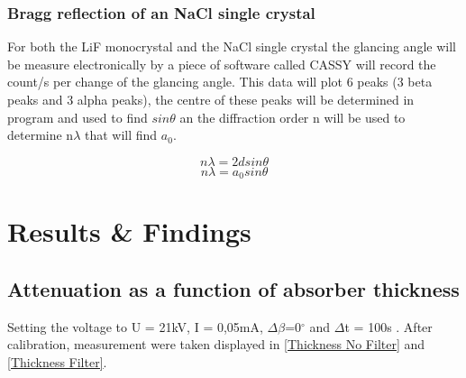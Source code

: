 \documentclass[12pt]{article}
\begin{document}
\subsubsection{Bragg reflection of an NaCl single crystal}
\label{Bragg reflection of an NaCl single crystal SubsubSection}

For both the LiF monocrystal and the NaCl single crystal the glancing angle will be measure electronically by a piece of software called CASSY will record the count/s per change of the glancing angle. This data will plot 6 peaks (3 beta peaks and 3 alpha peaks), the centre of these peaks will be determined in program and used to find $sin\theta$ an the diffraction order n will be used to determine n$\lambda$ that will find $a_0$.

\begin{equation}
n\lambda = 2d sin\theta
\label{Bragg Eq 1}
\end{equation}
\begin{equation}
n\lambda = a_0 sin\theta
\label{Bragg Eq 2}
\end{equation}

\section{Results \& Findings}
\label{Results & Findings Section}

\subsection{Attenuation as a function of absorber thickness}
\label{Attenuation as a function of absorber thickness SubSection}

Setting the voltage to U = 21kV, I = 0,05mA, $\Delta \beta$=0$^{\circ}$ and $\Delta$t = 100s \cite{Exp.D-2020}. After calibration, measurement were taken displayed in \cref{Thickness No Filter} and \cref{Thickness Filter}. 
\end{document}

